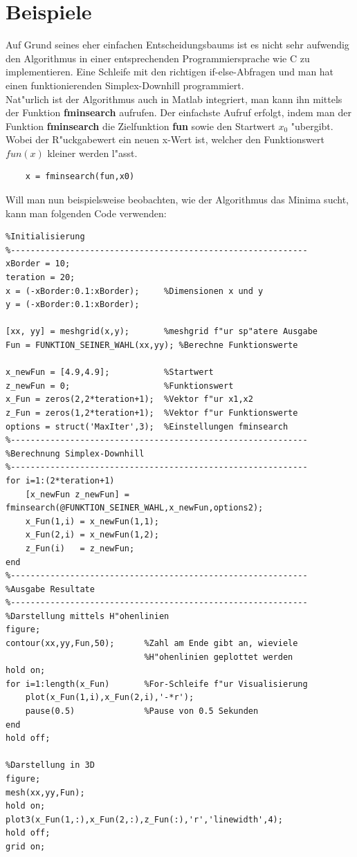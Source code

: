 \section{Beispiele}
Auf Grund seines eher einfachen Entscheidungsbaums ist es nicht sehr aufwendig den Algorithmus in einer entsprechenden Programmiersprache wie C zu implementieren. Eine Schleife mit den richtigen if-else-Abfragen und man hat einen funktionierenden Simplex-Downhill programmiert.\\
Nat"urlich ist der Algorithmus auch in Matlab integriert, man kann ihn mittels der Funktion \textbf{fminsearch} aufrufen. 
Der einfachste Aufruf erfolgt, indem man der Funktion \textbf{fminsearch} die Zielfunktion \textbf{fun} sowie den Startwert \textbf{$x_0$} "ubergibt. Wobei der R"uckgabewert ein neuen x-Wert ist, welcher den Funktionswert $fun(x)$ kleiner werden l"asst. 
\begin{lstlisting}
	x = fminsearch(fun,x0)
\end{lstlisting} 
Will man nun beispielsweise beobachten, wie der Algorithmus das Minima sucht, kann man folgenden Code verwenden: 
\begin{lstlisting}[style=Matlab]
%------------------------------------------------------------
%Initialisierung
%------------------------------------------------------------
xBorder = 10; 
teration = 20; 
x = (-xBorder:0.1:xBorder);     %Dimensionen x und y
y = (-xBorder:0.1:xBorder); 

[xx, yy] = meshgrid(x,y);       %meshgrid f"ur sp"atere Ausgabe
Fun = FUNKTION_SEINER_WAHL(xx,yy); %Berechne Funktionswerte

x_newFun = [4.9,4.9];           %Startwert
z_newFun = 0;                   %Funktionswert
x_Fun = zeros(2,2*teration+1);  %Vektor f"ur x1,x2
z_Fun = zeros(1,2*teration+1);  %Vektor f"ur Funktionswerte
options = struct('MaxIter',3);  %Einstellungen fminsearch
%------------------------------------------------------------
%Berechnung Simplex-Downhill
%------------------------------------------------------------
for i=1:(2*teration+1)
	[x_newFun z_newFun] = fminsearch(@FUNKTION_SEINER_WAHL,x_newFun,options2);
	x_Fun(1,i) = x_newFun(1,1);
	x_Fun(2,i) = x_newFun(1,2); 
	z_Fun(i)   = z_newFun; 
end
%------------------------------------------------------------
%Ausgabe Resultate
%------------------------------------------------------------
%Darstellung mittels H"ohenlinien
figure; 
contour(xx,yy,Fun,50);      %Zahl am Ende gibt an, wieviele 
                            %H"ohenlinien geplottet werden
hold on; 
for i=1:length(x_Fun)       %For-Schleife f"ur Visualisierung
    plot(x_Fun(1,i),x_Fun(2,i),'-*r'); 
    pause(0.5)              %Pause von 0.5 Sekunden
end
hold off; 

%Darstellung in 3D
figure; 
mesh(xx,yy,Fun);
hold on; 
plot3(x_Fun(1,:),x_Fun(2,:),z_Fun(:),'r','linewidth',4); 
hold off; 
grid on; 
\end{lstlisting}
